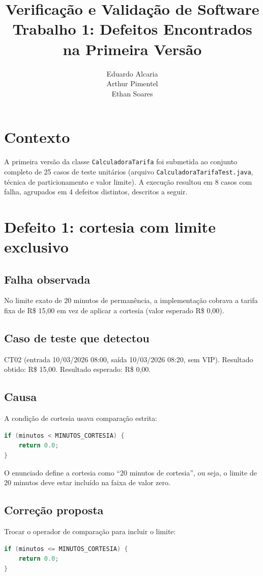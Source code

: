 \documentclass[11pt,a4paper]{article}
\title{Verificação e Validação de Software \\ \large Trabalho 1: Defeitos Encontrados na Primeira Versão}
\author{Eduardo Alcaria \\ Arthur Pimentel \\ Ethan Soares}
\date{}
\begin{document}
\maketitle
\vspace{-2.5em}

\section*{Contexto}

A primeira versão da classe \texttt{CalculadoraTarifa} foi submetida ao conjunto
completo de 25 casos de teste unitários (arquivo
\texttt{CalculadoraTarifaTest.java}, técnica de particionamento e valor limite).
A execução resultou em 8 casos com falha, agrupados em 4 defeitos distintos,
descritos a seguir.

\section*{Defeito 1: cortesia com limite exclusivo}

\subsection*{Falha observada}
No limite exato de 20 minutos de permanência, a implementação cobrava a tarifa
fixa de R\$ 15,00 em vez de aplicar a cortesia (valor esperado R\$ 0,00).

\subsection*{Caso de teste que detectou}
CT02 (entrada 10/03/2026 08:00, saída 10/03/2026 08:20, sem VIP). Resultado
obtido: R\$ 15,00. Resultado esperado: R\$ 0,00.

\subsection*{Causa}
A condição de cortesia usava comparação estrita:
\begin{lstlisting}[language=Java]
if (minutos < MINUTOS_CORTESIA) {
    return 0.0;
}
\end{lstlisting}
O enunciado define a cortesia como ``20 minutos de cortesia'', ou seja, o
limite de 20 minutos deve estar incluído na faixa de valor zero.

\subsection*{Correção proposta}
Trocar o operador de comparação para incluir o limite:
\begin{lstlisting}[language=Java]
if (minutos <= MINUTOS_CORTESIA) {
    return 0.0;
}
\end{lstlisting}
\end{document}
